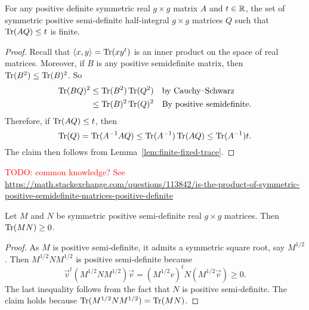 \documentclass{amsart}
\begin{document}
\begin{lemma}\label{lem:bound-trace-finite}
  For any positive definite symmetric real $g \times g$ matrix $A$ and $t \in \mathbb{R}$, the set of symmetric positive semi-definite half-integral $g \times g$ matrices $Q$ such that $\operatorname{Tr}(AQ) \leq t$ is finite.
\end{lemma}
\begin{proof}
  Recall that $\langle x,y \rangle = \operatorname{Tr}(xy^t)$ is an inner product on the space of real matrices. Moreover, if $B$ is any positive semidefinite matrix, then $\operatorname{Tr}(B^2) \leq \operatorname{Tr}(B)^2$. So
  \begin{align*}
    \operatorname{Tr}(BQ)^2 &\leq \operatorname{Tr}(B^2)\operatorname{Tr}(Q^2)
    &&\text{by Cauchy–Schwarz}
    \\
    &\leq \operatorname{Tr}(B)^2\operatorname{Tr}(Q)^2
    &&\text{By positive semidefinite.}
  \end{align*}
  Therefore, if $\operatorname{Tr}(AQ) \leq t$, then
  \[
    \operatorname{Tr}(Q) = \operatorname{Tr}(A^{-1}AQ) \leq \operatorname{Tr}(A^{-1})\operatorname{Tr}(AQ) \leq \operatorname{Tr}(A^{-1})t.
  \]
  The claim then follows from Lemma~\ref{lem:finite-fixed-trace}.
\end{proof}

\textcolor{red}{TODO: common knowledge? See \url{https://math.stackexchange.com/questions/113842/is-the-product-of-symmetric-positive-semidefinite-matrices-positive-definite}}

\begin{lemma}\label{lem:non-neg-tr}
  Let $M$ and $N$ be symmetric positive semi-definite real $g \times g$ matrices. Then $\operatorname{Tr}(MN) \geq 0$.
\end{lemma}
\begin{proof}
  As $M$ is positive semi-definite, it admits a symmetric square root, say $M^{1/2}$. Then $M^{1/2}NM^{1/2}$ is positive semi-definite because
  \[
    \vec{v}^t(M^{1/2}NM^{1/2})\vec{v}
    =
    (M^{1/2}v)^t N (M^{1/2}\vec{v})
    \geq 0.
  \]
  The last inequality follows from the fact that $N$ is positive semi-definite. The claim holds because $\operatorname{Tr}(M^{1/2}NM^{1/2}) = \operatorname{Tr}(MN)$.
\end{proof}
\end{document}
